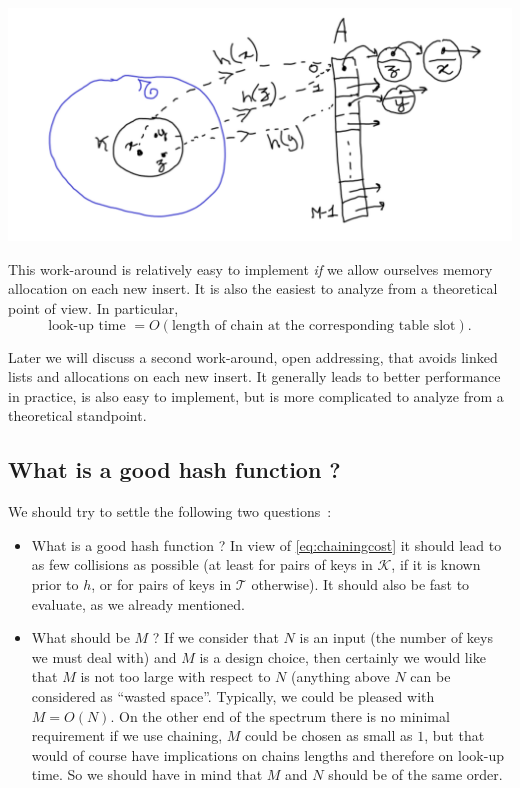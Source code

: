 \documentclass[12pt]{article}
\theoremstyle{plain}
\theoremstyle{remark}
\begin{document}
\includegraphics[width=14cm]{data/chaining.pdf}

This work-around is relatively easy to implement {\it if} we allow ourselves memory 
allocation on each new insert. It is also the easiest to analyze from a
theoretical point of view. In particular,
\begin{equation}\label{eq:chainingcost}
\text{look-up time } = O(\text{length of chain at the corresponding table
slot}).
\end{equation}

Later we will discuss a second work-around, open addressing, that avoids 
linked lists and allocations on each new insert. It generally leads to better
performance in practice, is also easy to implement, but is more complicated
to analyze from a theoretical standpoint. 

\subsection{What is a good hash function ?}

We should try to settle the following two questions~:
\begin{itemize}
	\item What is a good hash function ? In view of \eqref{eq:chainingcost}
		it should lead to as few collisions as possible (at least for
		pairs of keys in $\mathcal{K}$, if it is known prior to $h$, or
		for pairs of keys in $\mathcal{T}$ otherwise). It should also
		be fast to evaluate, as we already mentioned.
	\item What should be $M$ ? If we consider that $N$ is an input (the
		number of keys we must deal with) and $M$ is a design choice,
		then certainly we would like that $M$ is not too large with
		respect to $N$ (anything above $N$ can be considered as ``wasted
		space''. Typically, we could be pleased with $M = O(N).$ On the
		other end of the spectrum there is no minimal requirement if we 
		use chaining, $M$ could be chosen as small as $1$, but that
		would of course have implications on chains lengths and
		therefore on look-up time. So we should have in mind that $M$
		and $N$ should be of the same order.
\end{itemize}
	
\end{document}
